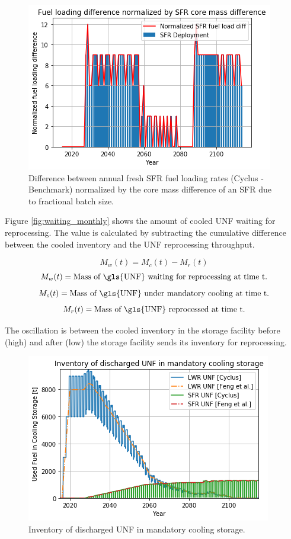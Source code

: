 \begin{figure}[htbp!]
	\begin{center}
		\includegraphics[scale=0.7]{./images/results_18/fuel_load_diff_norm.png}
	\end{center}
	\caption{Difference between annual fresh \gls{SFR} fuel loading rates (Cyclus - Benchmark) normalized by the core mass difference of an \gls{SFR} due to fractional batch size.}
	\label{fig:fuel_load_diff_norm}
\end{figure}


Figure \ref{fig:waiting_monthly} shows the amount of cooled \gls{UNF} waiting for
reprocessing. The value is calculated by subtracting the cumulative difference between
the cooled inventory and the \gls{UNF} reprocessing throughput.

\[ M_{w}(t) = M_{c}(t) - M_{r}(t) \]
\[ M_{w}(t) = \text{Mass of \gls{UNF} waiting for reprocessing at time t.}\]
\[ M_{c}(t) = \text{Mass of \gls{UNF} under mandatory cooling at time t.}\]
\[ M_{r}(t) = \text{Mass of \gls{UNF} reprocessed at time t.}\]

The oscillation is between the cooled inventory in the storage facility before (high)
and after (low) the storage facility sends its inventory for reprocessing.

\begin{figure}[htbp!]
	\begin{center}
		\includegraphics[scale=0.7]{./images/results_18/fuel_discharge_monthly.png}
	\end{center}
	\caption{Inventory of discharged \gls{UNF} in mandatory cooling storage.}
	\label{fig:fuel_discharge_monthly}
\end{figure}


